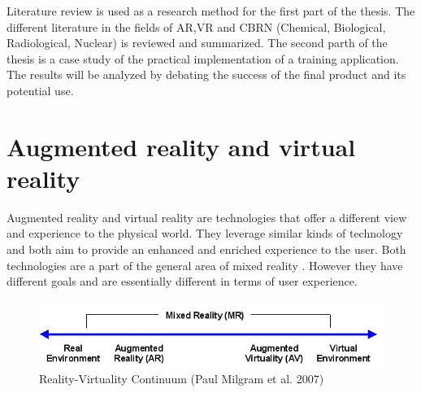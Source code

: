 \documentclass[12pt, a4paper,oneside, nocenter]{thesis}
\begin{document}
Literature review is used as a research method for the first part of the thesis. The different literature in the fields of AR,VR and CBRN (Chemical, Biological, Radiological, Nuclear) is reviewed and summarized. The second parth of the thesis is a case study of the practical implementation of a training application. The results will be analyzed by debating the success of the final product and its potential use.
\par
\chapter{\texorpdfstring{Augmented reality and virtual reality}{aug-reality}}
Augmented reality and virtual reality are technologies that offer a different view and experience to the physical world. They leverage similar kinds of technology and both aim to provide an enhanced and enriched experience to the user. Both technologies are a part of the general area of mixed reality . However they have different goals and are essentially different in terms of user experience.

\begin{figure}[H]
\includegraphics[width=\textwidth]{Virtuality_Continuum_2}
\caption{Reality-Virtuality Continuum (Paul Milgram et al. 2007)}
\label{fig:reality-virtuality}
\end{figure}
\end{document}
